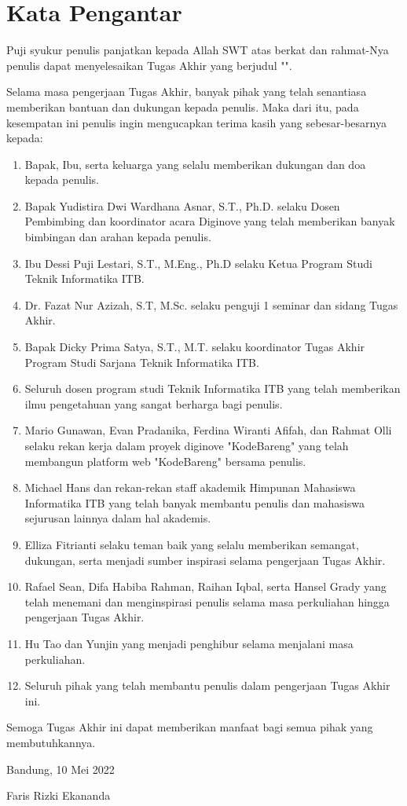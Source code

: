 \chapter*{Kata Pengantar}

Puji syukur penulis panjatkan kepada Allah SWT atas berkat dan rahmat-Nya penulis dapat menyelesaikan Tugas Akhir yang berjudul "\thetitle".

Selama masa pengerjaan Tugas Akhir, banyak pihak yang telah senantiasa memberikan bantuan dan dukungan kepada penulis. Maka dari itu, pada kesempatan ini penulis ingin mengucapkan terima kasih yang sebesar-besarnya kepada:

\begin{enumerate}
  \item Bapak, Ibu, serta keluarga yang selalu memberikan dukungan dan doa kepada penulis.
  \item Bapak Yudistira Dwi Wardhana Asnar, S.T., Ph.D. selaku Dosen Pembimbing dan koordinator acara Diginove yang telah memberikan banyak bimbingan dan arahan kepada penulis.
  \item Ibu Dessi Puji Lestari, S.T., M.Eng., Ph.D selaku Ketua Program Studi Teknik Informatika ITB.
  \item Dr. Fazat Nur Azizah, S.T, M.Sc. selaku penguji 1 seminar dan sidang Tugas Akhir.
  \item Bapak Dicky Prima Satya, S.T., M.T. selaku koordinator Tugas Akhir Program Studi Sarjana Teknik Informatika ITB.
  \item Seluruh dosen program studi Teknik Informatika ITB yang telah memberikan ilmu pengetahuan yang sangat berharga bagi penulis.
  \item Mario Gunawan, Evan Pradanika, Ferdina Wiranti Afifah, dan Rahmat Olli selaku rekan kerja dalam proyek diginove "KodeBareng" yang telah membangun platform web "KodeBareng" bersama penulis.
  \item Michael Hans dan rekan-rekan staff akademik Himpunan Mahasiswa Informatika ITB yang telah banyak membantu penulis dan mahasiswa sejurusan lainnya dalam hal akademis.
  \item Elliza Fitrianti selaku teman baik yang selalu memberikan semangat, dukungan, serta menjadi sumber inspirasi selama pengerjaan Tugas Akhir.
  \item Rafael Sean, Difa Habiba Rahman, Raihan Iqbal, serta Hansel Grady yang telah menemani dan menginspirasi penulis selama masa perkuliahan hingga pengerjaan Tugas Akhir.
  \item Hu Tao dan Yunjin yang menjadi penghibur selama menjalani masa perkuliahan.
  \item Seluruh pihak yang telah membantu penulis dalam pengerjaan Tugas Akhir ini.
\end{enumerate}

Semoga Tugas Akhir ini dapat memberikan manfaat bagi semua pihak yang membutuhkannya.

\begin{flushright}
  Bandung, 10 Mei 2022

  \vspace{1.25cm}

  Faris Rizki Ekananda
\end{flushright}